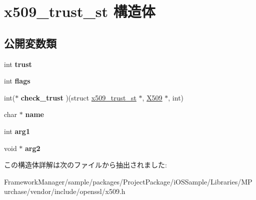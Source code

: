 \hypertarget{structx509__trust__st}{}\section{x509\+\_\+trust\+\_\+st 構造体}
\label{structx509__trust__st}
\subsection*{公開変数類}
\begin{DoxyCompactItemize}
\item 
\hypertarget{structx509__trust__st_a6840735427ee479d8796da9e838d6a77}{}int {\bfseries trust}\label{structx509__trust__st_a6840735427ee479d8796da9e838d6a77}

\item 
\hypertarget{structx509__trust__st_aee3ce09b9d6184cd66ad624b5689a676}{}int {\bfseries flags}\label{structx509__trust__st_aee3ce09b9d6184cd66ad624b5689a676}

\item 
\hypertarget{structx509__trust__st_a416ceaadc539241699efb993fb2dc707}{}int($\ast$ {\bfseries check\+\_\+trust} )(struct \hyperlink{structx509__trust__st}{x509\+\_\+trust\+\_\+st} $\ast$, \hyperlink{structx509__st}{X509} $\ast$, int)\label{structx509__trust__st_a416ceaadc539241699efb993fb2dc707}

\item 
\hypertarget{structx509__trust__st_a31ddd3f516ef8144ef40285f8f8f304d}{}char $\ast$ {\bfseries name}\label{structx509__trust__st_a31ddd3f516ef8144ef40285f8f8f304d}

\item 
\hypertarget{structx509__trust__st_a97e2b1d9d69d10172d982776c337c6d9}{}int {\bfseries arg1}\label{structx509__trust__st_a97e2b1d9d69d10172d982776c337c6d9}

\item 
\hypertarget{structx509__trust__st_af83753e80804cc408124be78954df1ef}{}void $\ast$ {\bfseries arg2}\label{structx509__trust__st_af83753e80804cc408124be78954df1ef}

\end{DoxyCompactItemize}


この構造体詳解は次のファイルから抽出されました\+:\begin{DoxyCompactItemize}
\item 
Framework\+Manager/sample/packages/\+Project\+Package/i\+O\+S\+Sample/\+Libraries/\+M\+Purchase/vendor/include/openssl/x509.\+h\end{DoxyCompactItemize}
